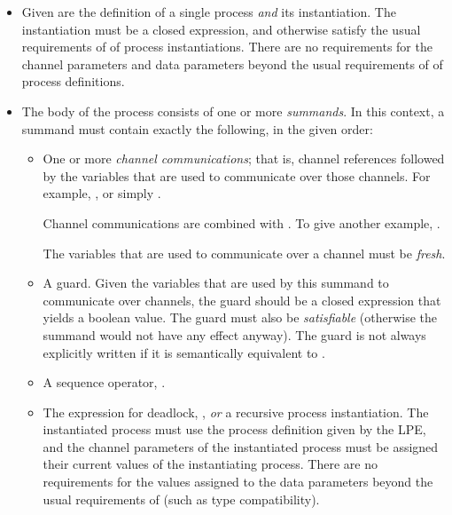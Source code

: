 \begin{itemize}

\item Given are the definition of a single process \emph{and} its instantiation.
The instantiation must be a closed expression, and otherwise satisfy the usual requirements of \txs{} of process instantiations.
There are no requirements for the channel parameters and data parameters beyond the usual requirements of \txs{} of process definitions.

\item The body of the process consists of one or more \emph{summands}.
In this context, a summand must contain exactly the following, in the given order:

\begin{itemize}

\item One or more \emph{channel communications}; that is, channel references followed by the variables that are used to communicate over those channels.
For example, , or simply .

Channel communications are combined with \inlinecode{|}.
To give another example, .

The variables that are used to communicate over a channel must be \emph{fresh}.

\item A guard.
Given the variables that are used by this summand to communicate over channels, the guard should be a closed expression that yields a boolean value.
The guard must also be \emph{satisfiable} (otherwise the summand would not have any effect anyway).
The guard is not always explicitly written if it is semantically equivalent to .

\item A sequence operator, \inlinecode{>->}.

\item The expression for deadlock, , \emph{or} a recursive process instantiation.
The instantiated process must use the process definition given by the LPE, and the channel parameters of the instantiated process must be assigned their current values of the instantiating process.
There are no requirements for the values assigned to the data parameters beyond the usual requirements of \txs{} (such as type compatibility).

\end{itemize}

\end{itemize}

